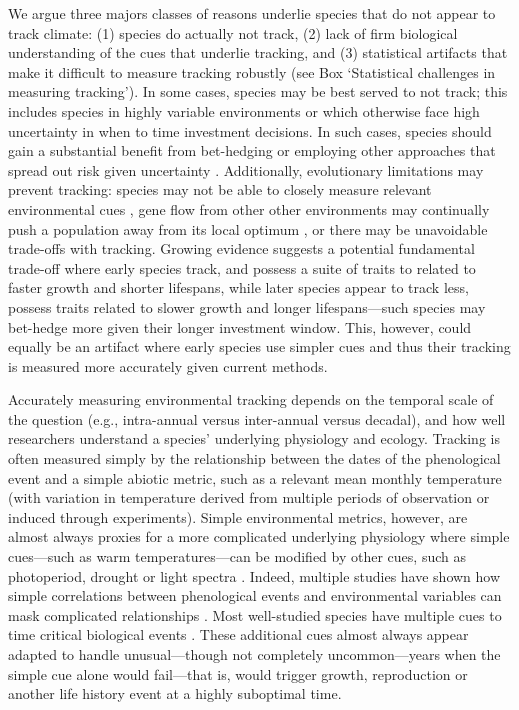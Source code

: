 \documentclass[11pt,letterpaper]{article}
\begin{document}
We argue three majors classes of reasons underlie species that do not appear to track climate: (1) species do actually not track, (2) lack of firm biological understanding of the cues that underlie tracking, and (3) statistical artifacts that make it difficult to measure tracking robustly (see Box `Statistical challenges in measuring tracking'). In some cases, species may be best served to not track; this includes species in highly variable environments or which otherwise face high uncertainty in when to time investment decisions. In such cases, species should gain a substantial benefit from bet-hedging or employing other approaches that spread out risk given uncertainty \citep{Venable:2007os,donald2013}. Additionally, evolutionary limitations may prevent tracking: species may not be able to closely measure relevant environmental cues \citep{arnold1992,Singer:2010eb}, gene flow from other other environments may continually push a population away from its local optimum \citep{lenormand2002}, or there may be unavoidable trade-offs \citep{levins1968} with tracking.  Growing evidence suggests a potential fundamental trade-off where early species track, and possess a suite of traits to related to faster growth and shorter lifespans, while later species appear to track less, possess traits related to slower growth and longer lifespans---such species may bet-hedge more given their longer investment window. This, however, could equally be an artifact where early species use simpler cues and thus their tracking is measured more accurately given current methods. 

Accurately measuring environmental tracking depends on the temporal scale of the question (e.g., intra-annual versus inter-annual versus decadal), and how well researchers understand a species' underlying physiology and ecology. Tracking is often measured simply by the relationship between the dates of the phenological event and a simple abiotic metric, such as a relevant mean monthly temperature (with variation in temperature derived from multiple periods of observation or induced through experiments). Simple environmental metrics, however, are almost always proxies for a more complicated underlying physiology where simple cues---such as warm temperatures---can be modified by other cues, such as photoperiod, drought or light spectra \citep{Bagnall1993,Stinchcombe:2004ec}. Indeed, multiple studies have shown how simple correlations between phenological events and environmental variables can mask complicated relationships \citep{Cook:2012pnas,thackeray2016,tansey2017}. Most well-studied species have multiple cues to time critical biological events \citep{chuinearees}. These additional cues almost always appear adapted to handle unusual---though not completely uncommon---years when the simple cue alone would fail---that is, would trigger growth, reproduction or another life history event at a highly suboptimal time. 
\end{document}
